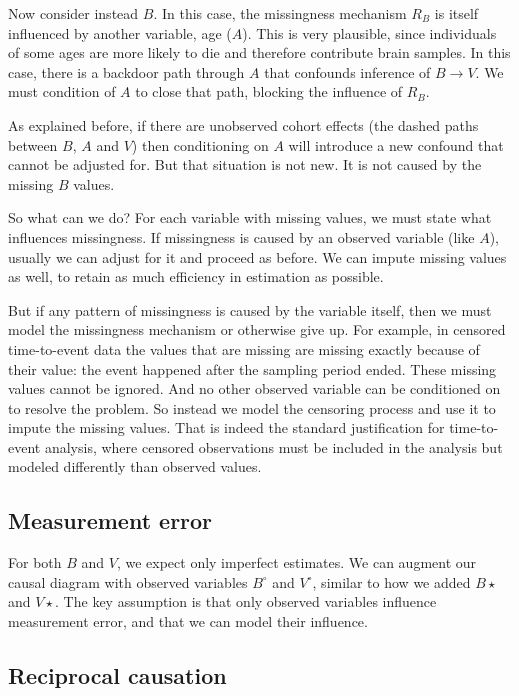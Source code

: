 \documentclass[reqno ,11pt]{amsart}
\begin{document}
Now consider instead $B$. In this case, the missingness mechanism $R_B$ is itself influenced by another variable, age ($A$). This is very plausible, since individuals of some ages are more likely to die and therefore contribute brain samples. In this case, there is a backdoor path through $A$ that confounds inference of $B \rightarrow V$. We must condition of $A$ to close that path, blocking the influence of $R_B$. 

As explained before, if there are unobserved cohort effects (the dashed paths between $B$, $A$ and $V$) then conditioning on $A$ will introduce a new confound that cannot be adjusted for. But that situation is not new. It is not caused by the missing $B$ values.

So what can we do? For each variable with missing values, we must state what influences missingness. If missingness is caused by an observed variable (like $A$), usually we can adjust for it and proceed as before. We can impute missing values as well, to retain as much efficiency in estimation as possible. 

But if any pattern of missingness is caused by the variable itself, then we must model the missingness mechanism or otherwise give up. For example, in censored time-to-event data the values that are missing are missing exactly because of their value: the event happened after the sampling period ended. These missing values cannot be ignored. And no other observed variable can be conditioned on to resolve the problem. So instead we model the censoring process and use it to impute the missing values. That is indeed the standard justification for time-to-event analysis, where censored observations must be included in the analysis but modeled differently than observed values.


\subsection{Measurement error}

For both $B$ and $V$, we expect only imperfect estimates. We can augment our causal diagram with observed variables $B^\circ$ and $V^\circ$, similar to how we added $B\star$ and $V\star$. The key assumption is that only observed variables influence measurement error, and that we can model their influence.


\subsection{Reciprocal causation}
\end{document}
